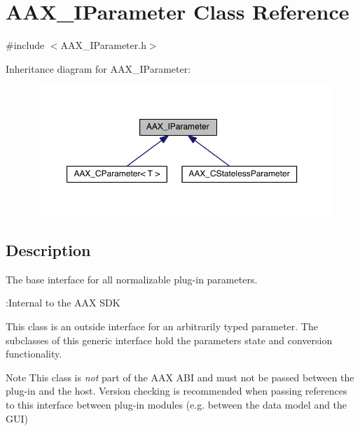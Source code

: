 \hypertarget{a00108}{}\section{A\+A\+X\+\_\+\+I\+Parameter Class Reference}
\label{a00108}


{\ttfamily \#include $<$A\+A\+X\+\_\+\+I\+Parameter.\+h$>$}



Inheritance diagram for A\+A\+X\+\_\+\+I\+Parameter\+:
\nopagebreak
\begin{figure}[H]
\begin{center}
\leavevmode
\includegraphics[width=350pt]{a00648}
\end{center}
\end{figure}


\subsection{Description}
The base interface for all normalizable plug-\/in parameters. 

\begin{DoxyRefDesc}{\+:\+Internal to the A\+A\+X S\+D\+K}
\item[\hyperlink{a00006__aax_sdk_internal000002}{\+:\+Internal to the A\+A\+X S\+D\+K}]\end{DoxyRefDesc}


This class is an outside interface for an arbitrarily typed parameter. The subclasses of this generic interface hold the parameter\textquotesingle{}s state and conversion functionality.

\begin{DoxyNote}{Note}
This class is {\itshape not} part of the A\+A\+X A\+B\+I and must not be passed between the plug-\/in and the host. Version checking is recommended when passing references to this interface between plug-\/in modules (e.\+g. between the data model and the G\+U\+I) 
\end{DoxyNote}
